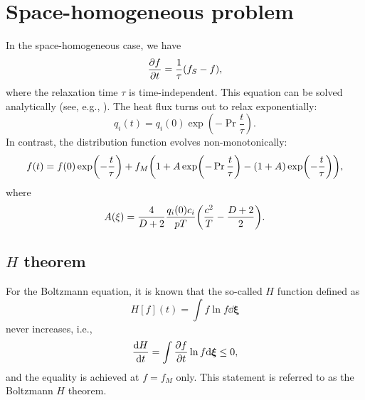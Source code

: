 \documentclass{article}
\newcommand{\bxi}{\boldsymbol{\xi}}
\begin{document}
\section{Space-homogeneous problem}

In the space-homogeneous case, we have
\begin{equation}\label{eq:relax}
    \pdv{f}{t} = \frac1\tau\qty(f_S - f),
\end{equation}
where the relaxation time $\tau$ is time-independent.
This equation can be solved analytically (see, e.g., \cite{titarev2004numerical}).
The heat flux turns out to relax exponentially:
\begin{equation}\label{eq:relax:q}
    q_i(t) = q_i(0)\exp(-\Pr\frac{t}\tau).
\end{equation}
In contrast, the distribution function evolves non-monotonically:
\begin{equation}\label{eq:relax:f}
    f(t) = f(0)\exp(-\frac{t}\tau) + f_M\qty(1 + A\exp(-\Pr\frac{t}\tau) - (1+A)\exp(-\frac{t}\tau)),
\end{equation}
where
\begin{equation}\label{eq:relax:A}
    A(\xi) = \frac{4}{D+2}\frac{q_i(0)c_i}{pT}\qty(\frac{c^2}{T} - \frac{D+2}2).
\end{equation}

\subsection{$H$ theorem}

For the Boltzmann equation, it is known that the so-called $H$ function defined as
\begin{equation}\label{eq:H}
    H[f](t) = \int f\ln{f}\dd\bxi
\end{equation}
never increases, i.e.,
\begin{equation}\label{eq:dHdt}
    \dv{H}{t} = \int \pdv{f}{t}\ln{f}\dd\bxi \leq 0,
\end{equation}
and the equality is achieved at $f = f_M$ only.
This statement is referred to as the Boltzmann $H$ theorem.
\end{document}
